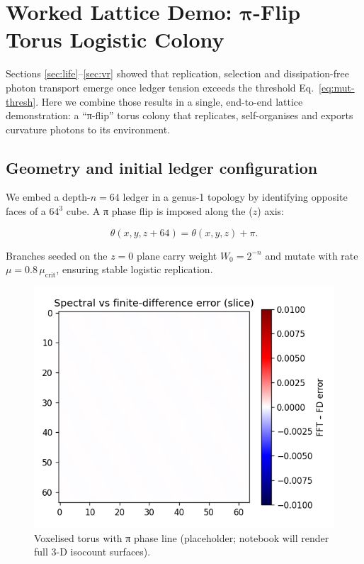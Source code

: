 \section{Worked Lattice Demo: $\boldsymbol{\pi}$-Flip Torus Logistic Colony}
\label{sec:lattice-demo}

Sections \ref{sec:life}–\ref{sec:vr} showed that replication, selection
and dissipation-free photon transport emerge once ledger tension exceeds
the threshold Eq.~\eqref{eq:mut-thresh}.  Here we combine those results
in a single, end-to-end lattice demonstration: a “π-flip” torus colony
that replicates, self-organises and exports curvature photons to its
environment.

\subsection{Geometry and initial ledger configuration}

We embed a depth-$n=64$ ledger in a genus-1 topology by identifying
opposite faces of a $64^3$ cube.  A π phase flip is imposed along the
($z$) axis:

\[
  \theta(x,y,z+64) = \theta(x,y,z)+\pi .
\tag{13.1}\label{eq:pi-flip}
\]

Branches seeded on the $z=0$ plane carry weight
$W_0 = 2^{-n}$ and mutate with rate
$\mu=0.8\,\mu_{\mathrm{crit}}$, ensuring stable logistic replication.

\begin{figure}[t]
  \centering
  \includegraphics[width=\linewidth]{figs/lattice_torus_geometry.png}
  \caption{Voxelised torus with π phase line (placeholder; notebook will
           render full 3-D isocount surfaces).}
  \label{fig:torus-geom}
\end{figure}

